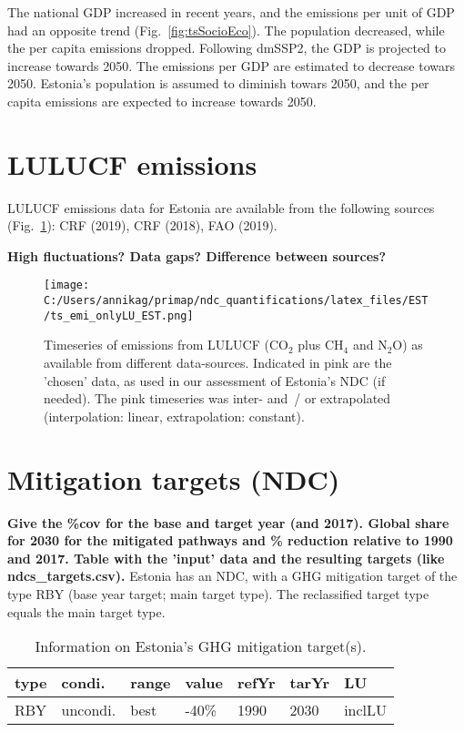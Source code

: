 \documentclass[12pt]{article}
\begin{document}
 The national GDP increased in recent years, and the emissions per unit of GDP had an opposite trend (Fig.~\ref{fig:tsSocioEco}).
 The population decreased, while the per capita emissions dropped. 
 Following dmSSP2, the GDP is projected to increase towards 2050. 
 The emissions per GDP are estimated to decrease towars 2050. 
 Estonia's population is assumed to diminish towars 2050, and the per capita emissions are expected to increase towards 2050. 

 \newpage %
 \section{LULUCF emissions}
 \label{sec:emiLULUCF}
 LULUCF emissions data for Estonia are available from the following sources (Fig.~\ref{fig:tsLULUCF}): CRF (2019), CRF (2018), FAO (2019).

 \textbf{High fluctuations? Data gaps? Difference between sources?}

 \begin{figure}[H]
 \centering
 \texttt{[image: C:/Users/annikag/primap/ndc\_quantifications/latex\_files/EST/ts\_emi\_onlyLU\_EST.png]}
 \caption{Timeseries of emissions from LULUCF (CO$_2$ plus CH$_4$ and N$_2$O) as available from different data-sources. 
 Indicated in pink are the 'chosen' data, as used in our assessment of Estonia's NDC (if needed). 
 The pink timeseries was inter- and~/ or extrapolated (interpolation: linear, extrapolation: constant).}
 \label{fig:tsLULUCF}
 \end{figure}

 \newpage %
 \section{Mitigation targets (NDC)}
 \label{sec:mitiTars}

 \textbf{ 
 Give the \%cov for the base and target year (and 2017).
 Global share for 2030 for the mitigated pathways and \% reduction relative to 1990 and 2017.
 Table with the 'input' data and the resulting targets (like ndcs\_targets.csv).}
 Estonia has an NDC, with a GHG mitigation target of the type RBY (base year target; main target type).
 The reclassified target type equals the main target type.

 \begin{table}[H]
 \centering
 \caption{Information on Estonia's GHG mitigation target(s).}
 \label{tab:mitiTars}
 \begin{tabular}{l l l l l l l }
 \bfseries type & \bfseries condi. & \bfseries range & \bfseries value & \bfseries refYr & \bfseries tarYr & \bfseries LU \tabularnewline \hline
 RBY & uncondi. & best & -40\% & 1990 & 2030 & inclLU \tabularnewline 
 \end{tabular}
 \end{table}
\end{document}
